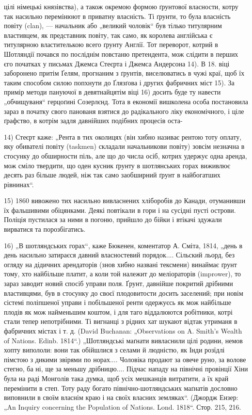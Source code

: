 цілі німецькі князівства), а також окремою формою ґрунтової власности, котру так насильно перемінюют
в приватну власність. Ті ґрунти, то була власність повіту (clan), — начальник або „великий чоловік“
був тілько титулярним властивцем, як представник повіту, так само, як королева англійська є
титулярною властителькою всего ґрунту Англії. Тот переворот, котрий в Шотляндії почався по посліднім
повстаню претендента, мож слідити в перших єго початках у письмах Джемса Стеєрта і Джемса Андерсона
14). В 18. віці заборонено притім Ґелям, прогнаним з ґрунтів, виселюватись в чужі краї, щоб їх таким
способом силою попхнути до Ґлязґова і других фабричних міст 15). За примір
методи пануючої в девятнайцятім віці 16) досить буде ту навести „обчищуваня“ герцоґині Созерлєнд.
Тота в економії вишколена особа постановила зараз в початку свого панованя взятися до радікального
ліку економічного, і ціле ґрафство, в котрім задля давнійших подібних процесів оста-

14) Стеєрт каже: „Рента в тих околицях (він хибно називає рентою тоту оплату, яку обивателі повіту
(taskmen) складали начальникови повіту) зовсім незначна в стосунку до обширности піль, але що до
числа осіб, котрих удержує одна аренда, мож сміло твердити, що оден кусник ґрунту в шотлянських
горах виживлює десять раз більше людей, ніж так само заобширний ґрунт в найбогатших рівнинах“.

15) 1860 вивожено тих насильно вивласнених хліборобів до Канади, отуманивши їх фальшивими
обіцянками. Деякі повтікали в гори і на сусідні пусті острови. Поліція пустилася за ними в погоню,
прийшло до бійки і втікачі здужали вирватися та порозбігатись.

16) „В шотляндських горах“, каже Бюкенен, коментатор А. Сміта, 1814, „день в день насильно затираєся
давний власностевий порядок.... Сільский льорд, без огляду на дідичних арендаторів (знов хибно
названі тексмени) винаймає ґрунт тому, хто найбільше платит, а коли той належит до меліораторів
(imprower), то зараз заводит новий спосіб управи поля. Ґрунт, давнійше покритий дрібними
властивцями, був в стосунку до своєї плодовитости досить заселений; при новім сістемі поліпшеної
управи і побільшеної ренти одержуєсь як мож найбільше плодів як мож найменьшим коштом, і для таго
віддалюются робітники, котрі стали тепер непотрібними. Ті вигнанці з рідних хат шукают відтак
утриманя в фабричних містах і т. д. (David Buchanan: „Observations on A. Smith’s Wealth of Nations.
Edinb. 1814“.) „Шотляндські маґнати вивласнили цілі родини, немов хопту випололи: вони так обійшлися
з селами й людністю, як Інди розїдлі пімстою з дикими звірями по норах.... Чоловіка продают
за овече руно, за волове стегно, ба ні, ще за меньшу дрібницю.... Підчас нападу на північні
провінції Хіни була на раді Монголів така думка, щоб усіх мешканців витратити, а їх край перемінити
в степ. Тоту раду богато північно-шотляндських маґнатів дословно виповнили в своїм власнім краю і на
своїх власних земляках“. (Джордж Ензер: „An Inquiry concerning the Population of Nations. Lond.
1818“. Стор. 215, 216.

